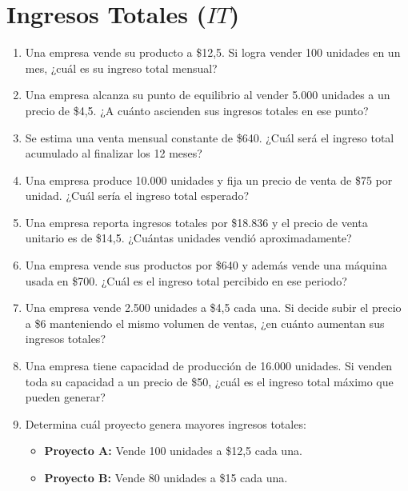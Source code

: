 \documentclass[12pt,a4paper]{article}
\newcommand{\answerspace}{\vspace{4.5cm}}
\begin{document}
\newpage

\section{Ingresos Totales ($IT$)}

\begin{enumerate}[label=\textbf{\arabic*.}, leftmargin=*, itemsep=0pt]

\item Una empresa vende su producto a \$12,5. Si logra vender 100 unidades en un mes, ¿cuál es su ingreso total mensual?
\answerspace

\item Una empresa alcanza su punto de equilibrio al vender 5.000 unidades a un precio de \$4,5. ¿A cuánto ascienden sus ingresos totales en ese punto?
\answerspace

\item Se estima una venta mensual constante de \$640. ¿Cuál será el ingreso total acumulado al finalizar los 12 meses?
\answerspace

\item Una empresa produce 10.000 unidades y fija un precio de venta de \$75 por unidad. ¿Cuál sería el ingreso total esperado?
\answerspace

\item Una empresa reporta ingresos totales por \$18.836 y el precio de venta unitario es de \$14,5. ¿Cuántas unidades vendió aproximadamente?
\answerspace

\item Una empresa vende sus productos por \$640 y además vende una máquina usada en \$700. ¿Cuál es el ingreso total percibido en ese periodo?
\answerspace

\item Una empresa vende 2.500 unidades a \$4,5 cada una. Si decide subir el precio a \$6 manteniendo el mismo volumen de ventas, ¿en cuánto aumentan sus ingresos totales?
\answerspace

\item Una empresa tiene capacidad de producción de 16.000 unidades. Si venden toda su capacidad a un precio de \$50, ¿cuál es el ingreso total máximo que pueden generar?
\answerspace

\item Determina cuál proyecto genera mayores ingresos totales:
  \begin{itemize}
    \item \textbf{Proyecto A:} Vende 100 unidades a \$12,5 cada una.
    \item \textbf{Proyecto B:} Vende 80 unidades a \$15 cada una.
  \end{itemize}
\answerspace


\end{enumerate}
\end{document}
